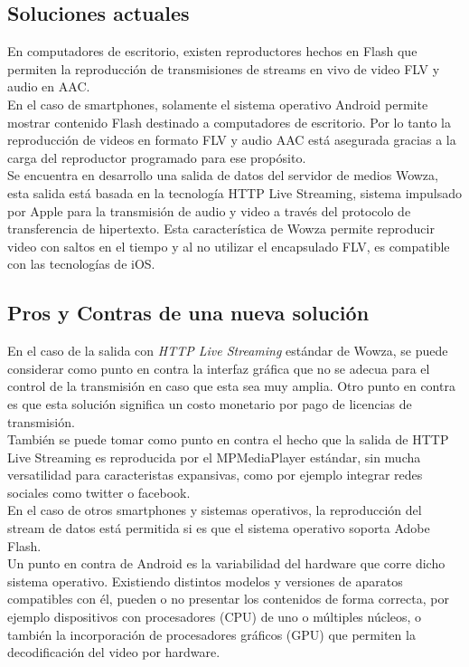 \subsection{Soluciones actuales}
En computadores de escritorio, existen reproductores hechos en Flash que permiten la reproducción de transmisiones de streams en vivo de video FLV y audio en AAC.\\

	En el caso de smartphones, solamente el sistema operativo Android permite mostrar contenido Flash destinado a computadores de escritorio. Por lo tanto la reproducción de videos en formato FLV y audio AAC está asegurada gracias a la carga del reproductor programado para ese propósito.\\

Se encuentra en desarrollo una salida de datos del servidor de medios Wowza, esta salida está basada en la tecnología HTTP Live Streaming, sistema impulsado por Apple para la transmisión de audio y video a través del protocolo de transferencia de hipertexto. Esta característica de Wowza permite reproducir video con  saltos en el tiempo y al no utilizar el encapsulado FLV, es compatible con las tecnologías de iOS.

\subsection{Pros y Contras de una nueva solución}
En el caso de la salida con \textit{HTTP Live Streaming} estándar de Wowza, se puede considerar como punto en contra la interfaz gráfica que no se adecua para el control de la transmisión en caso que esta sea muy amplia. Otro punto en contra es que esta solución significa un costo monetario por pago de licencias de transmisión.\\

	También se puede tomar como punto en contra el hecho que la salida de HTTP Live Streaming es reproducida por el MPMediaPlayer estándar, sin mucha versatilidad para caracteristas expansivas, como por ejemplo integrar redes sociales como twitter o facebook.\\

	En el caso de otros smartphones y sistemas operativos, la reproducción del stream de datos está permitida si es que el sistema operativo soporta Adobe Flash.\\

	Un punto en contra de Android es la variabilidad del hardware que corre dicho sistema operativo. Existiendo distintos modelos y versiones de aparatos compatibles con él, pueden o no presentar los contenidos de forma correcta, por ejemplo dispositivos con procesadores (CPU) de uno o múltiples núcleos, o también la incorporación de procesadores gráficos (GPU) que permiten la decodificación del video por hardware.\\

